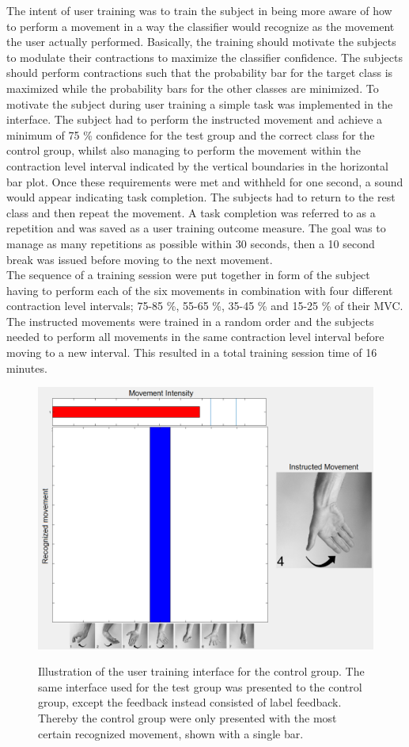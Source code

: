 The intent of user training was to train the subject in being more aware of how to perform a movement in a way the classifier would recognize as the movement the user actually performed. Basically, the training should motivate the subjects to modulate their contractions to maximize the classifier confidence. The subjects should perform contractions such that the probability bar for the target class is maximized while the probability bars for the other classes are minimized. To motivate the subject during user training a simple task was implemented in the interface. The subject had to perform the instructed movement and achieve a minimum of 75 \% confidence for the test group and the correct class for the control group, whilst also managing to perform the movement within the contraction level interval indicated by the vertical boundaries in the horizontal bar plot. Once these requirements were met and withheld for one second, a sound would appear indicating task completion. The subjects had to return to the rest class and then repeat the movement. A task completion was referred to as a repetition and was saved as a user training outcome measure. The goal was to manage as many repetitions as possible within 30 seconds, then a 10 second break was issued before moving to the next movement. \\
The sequence of a training session were put together in form of the subject having to perform each of the six movements in combination with four different contraction level intervals; 75-85 \%, 55-65 \%, 35-45 \% and 15-25 \% of their MVC. The instructed movements were trained in a random order and the subjects needed to perform all movements in the same contraction level interval before moving to a new interval. This resulted in a total training session time of 16 minutes.  

\begin{figure}[H]
	\includegraphics[width=.47\textwidth]{figures/xBackground/usertraincontrolGUI} \\
	\caption{Illustration of the user training interface for the control group. The same interface used for the test group was presented to the control group, except the feedback instead consisted of label feedback. Thereby the control group were only presented with the most certain recognized movement, shown with a single bar.}
	\label{fig:control}
\end{figure}       


